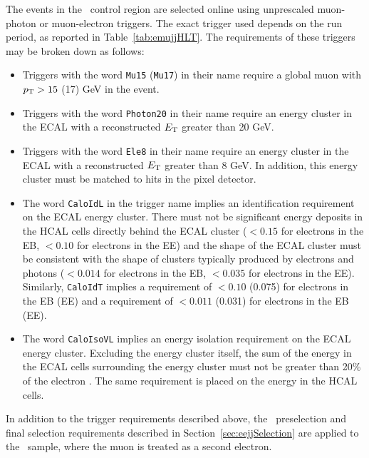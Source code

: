 The events in the \emujj~control region are selected online using unprescaled muon-photon 
or muon-electron triggers.
The exact trigger used depends on the run period, as reported in Table~\ref{tab:emujjHLT}.
The requirements of these triggers may be broken down as follows:
\begin{itemize}
\item Triggers with the word {\tt Mu15} ({\tt Mu17}) in their name require a global muon with $p_{\text{T}} > 15$ (17) GeV in the event.
\item Triggers with the word {\tt Photon20} in their name require an energy cluster in the ECAL with a reconstructed $E_{\text{T}}$ greater than 20 GeV.
\item Triggers with the word {\tt Ele8} in their name require an energy cluster in the ECAL with a reconstructed $E_{\text{T}}$ greater than 8 GeV.  In addition,
  this energy cluster must be matched to hits in the pixel detector.
\item The word {\tt CaloIdL} in the trigger name implies an identification requirement on the ECAL energy cluster.  
There must not be significant energy deposits in the HCAL cells directly behind the ECAL cluster
(\HoE$ < 0.15$ for electrons in the EB, \HoE$ < 0.10$ for electrons in the EE)
and the shape of the ECAL cluster must be consistent with the shape of clusters typically produced by electrons and photons
(\SigmaiEtaiEta$ < 0.014$ for electrons in the EB, \SigmaiEtaiEta$ < 0.035$ for electrons in the EE).
Similarly, {\tt CaloIdT} implies a 
requirement of \HoE$< 0.10$ (0.075) for electrons in the EB (EE) and a 
requirement of \SigmaiEtaiEta$ < 0.011$ (0.031) for electrons in the EB (EE).
\item The word {\tt CaloIsoVL} implies an energy isolation requirement on the ECAL energy cluster.
Excluding the energy cluster itself, the sum of the energy in the ECAL cells surrounding the energy cluster
must not be greater than 20\% of the electron \et.  The same requirement is placed on the energy
in the HCAL cells.
\end{itemize}

In addition to the trigger requirements described above, the \eejj~preselection and final selection requirements described 
in Section~\ref{sec:eejjSelection} are applied to the \emujj~sample, where the muon is treated as a second electron.  

